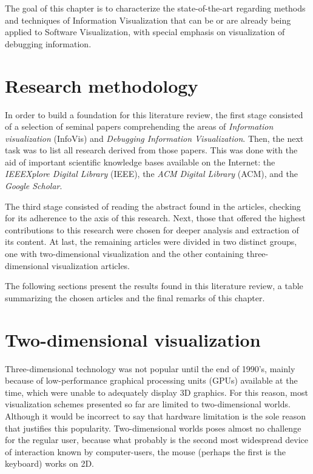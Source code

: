 The goal of this chapter is to characterize the state-of-the-art regarding
methods and techniques of Information Visualization that can be or are already
being applied to Software Visualization, with special emphasis on visualization
of debugging information.

\section{Research methodology}

In order to build a foundation for this literature review, the first stage
consisted of a selection of seminal papers comprehending the areas of
\textit{Information visualization} (InfoVis) and \textit{Debugging Information
Visualization}. Then, the next task was to list all research derived
from those papers. This was done with the aid of important scientific knowledge
bases available on the Internet: the \textit{IEEEXplore Digital Library} (IEEE),
the \textit{ACM Digital Library} (ACM), and the \textit{Google Scholar}.

The third stage consisted of reading the abstract found in the articles,
checking for its adherence to the axis of this research. Next, those that
offered the highest contributions to this research were chosen for deeper
analysis and extraction of its content. At last, the remaining articles were
divided in two distinct groups, one with two-dimensional visualization and the
other containing three-dimensional visualization articles.

The following sections present the results found in this literature review, a
table summarizing the chosen articles and the final remarks of this chapter.

\section{Two-dimensional visualization}\label{subsec:2dstateofart}

Three-dimensional technology was not popular until the end of 1990's, mainly
because of low-performance graphical processing units (GPUs) available at the
time, which were unable to adequately display 3D graphics.
For this reason, most visualization schemes presented so far are limited to
two-dimensional worlds. Although it would be incorrect to say that hardware
limitation is the sole reason that justifies this popularity. Two-dimensional
worlds poses almost no challenge for the regular user, because what probably is
the second most widespread device of interaction known by computer-users, the
mouse (perhaps the first is the keyboard) works on 2D.

